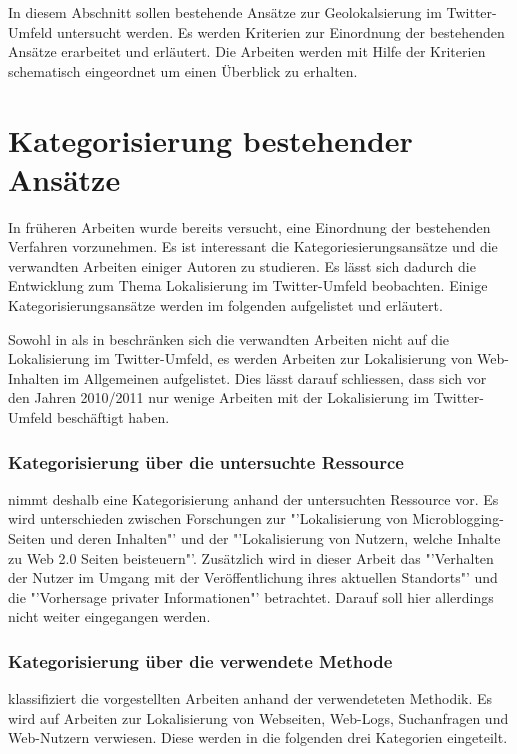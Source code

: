 	In diesem Abschnitt sollen bestehende Ansätze zur Geolokalsierung im Twitter-Umfeld untersucht werden. 
	Es werden Kriterien zur Einordnung der bestehenden Ansätze erarbeitet und erläutert.   
	Die Arbeiten werden mit Hilfe der Kriterien schematisch eingeordnet um einen Überblick zu erhalten. 

		\section{Kategorisierung bestehender Ansätze}

		In früheren Arbeiten wurde bereits versucht, eine Einordnung der bestehenden Verfahren vorzunehmen. 
		Es ist interessant die Kategoriesierungsansätze und die verwandten Arbeiten einiger Autoren zu studieren.
		Es lässt sich dadurch die Entwicklung zum Thema Lokalisierung im Twitter-Umfeld beobachten. 
		Einige Kategorisierungsansätze werden im folgenden aufgelistet und erläutert.

		Sowohl in \cite{Hecht2011} als in \cite{Cheng2010} beschränken sich die verwandten Arbeiten nicht auf die Lokalisierung im Twitter-Umfeld, es werden Arbeiten zur Lokalisierung von Web-Inhalten im Allgemeinen aufgelistet. 
		Dies lässt darauf schliessen, dass sich vor den Jahren 2010/2011 nur wenige Arbeiten mit der Lokalisierung im Twitter-Umfeld beschäftigt haben.  
		
		\subsubsection{Kategorisierung über die untersuchte Ressource}
		
			\cite{Hecht2011} nimmt deshalb eine Kategorisierung anhand der untersuchten Ressource vor. 
			Es wird unterschieden zwischen Forschungen zur "'Lokalisierung von Microblogging-Seiten und deren Inhalten"' und der "'Lokalisierung von Nutzern, welche Inhalte zu Web 2.0 Seiten beisteuern"'. 
			Zusätzlich wird in dieser Arbeit das "'Verhalten der Nutzer im Umgang mit der Veröffentlichung ihres aktuellen Standorts"' und die "'Vorhersage privater Informationen"' betrachtet. Darauf soll hier allerdings nicht weiter eingegangen werden.      

		\subsubsection{Kategorisierung über die verwendete Methode}

			\cite{Cheng2010} klassifiziert die vorgestellten Arbeiten anhand der verwendeteten Methodik. 
			Es wird auf Arbeiten zur Lokalisierung von Webseiten, Web-Logs, Suchanfragen und Web-Nutzern verwiesen. 
			Diese werden in die folgenden drei Kategorien eingeteilt.

